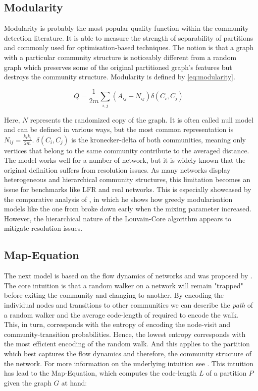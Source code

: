 \documentclass[11pt, twocolumn]{article}
\begin{document}
\subsection{Modularity}
Modularity is probably the most popular quality function within the community detection literature.\cite{fortunato_CommunityDetectionGraphs_2010} It is able to measure the strength of separability of partitions and commonly used for optimisation-based techniques. The notion is that a graph with a particular community structure is noticeably different from a random graph which preserves some of the original partitioned graph's features but destroys the community structure. Modularity is defined by \autoref{eq:modularity}.

\begin{equation}
    \label{eq:modularity}
    Q = \frac{1}{2m}\sum_{i,j}(A_{ij}-N_{ij})\delta(C_i,C_j)
\end{equation}

Here, $N$ represents the randomized copy of the graph. It is often called null model and can be defined in various ways, but the most common representation is $N_{ij} = \frac{k_ik_j}{2m}$. $\delta(C_i, C_j)$ is the kronecker-delta of both communities, meaning only vertices that belong to the same community contribute to the averaged distance. The model works well for a number of network, but it is widely known that the original definition suffers from resolution issues. As many networks display heterogeneous and hierarchical community structures, this limitation becomes an issue for benchmarks like LFR and real networks. This is especially showcased by the comparative analysis of \citeauthor{lancichinetti_CommunityDetectionAlgorithms_2009}, in which he shows how greedy modularisation models like the one from \citeauthor{clauset_FindingCommunityStructure_2004} broke down early when the mixing parameter increased.\cite{lancichinetti_CommunityDetectionAlgorithms_2009} However, the hierarchical nature of the Louvain-Core algorithm appears to mitigate resolution issues. 

\subsection{Map-Equation}
The next model is based on the flow dynamics of networks and was proposed by \citeauthor{rosvall_MapEquation_2009}.\cite{rosvall_MapEquation_2009} The core intuition is that a random walker on a network will remain "trapped" before exiting the community and changing to another. By encoding the individual nodes and transitions to other communities we can describe the \emph{path} of a random walker and the average code-length of required to encode the walk. This, in turn, corresponds with the entropy of encoding the node-visit and community-transition probabilities. Hence, the lowest entropy corresponds with the most efficient encoding of the random walk. And this applies to the partition which best captures the flow dynamics and therefore, the community structure of the network. For more information on the underlying intuition see \citeauthor{bohlin_CommunityDetectionVisualization_2014}. This intuition has lead to the Map-Equation, which computes the code-length $L$ of a partition $P$ given the graph $G$ at hand:
\end{document}
